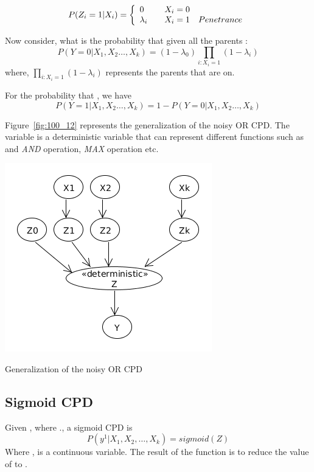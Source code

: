 \[
  P(Z_i =1 |X_i	) = \left\{
  \begin{array}{l l}
    0  & \quad X_i=0\\
    \lambda_i & \quad X_i=1 \quad Penetrance\\
  \end{array} \right.
\]

Now consider, what is the probability that  given all the parents :
\[P(Y=0|X_1,X_2 \ldots, X_k) = (1-\lambda_0	) \prod\limits_{i:X_i=1} (1-\lambda_i) \] where, $\prod\limits_{i:X_i=1} (1-\lambda_i)$ represents the parents that are on.

For the probability that , we have
\[  P(Y=1|X_1,X_2 \ldots, X_k) =   1- P(Y=0|X_1,X_2 \ldots, X_k)  \]

 Figure~\ref{fig:100_12} represents the generalization of the noisy OR CPD.  The variable  is a deterministic variable that can represent different functions such as and \emph{AND} operation, \emph{MAX} operation etc.

\begin{marginfigure}
\includegraphics{images/100_12}
\caption{Generalization of the noisy OR CPD}
\label{fig:100_12}
\end{marginfigure}

\subsection{Sigmoid CPD} 

Given , where ., a sigmoid CPD is
\[P(y^1 | X_1, X_2, \ldots, X_k) = sigmoid(Z) \]
Where ,  is a continuous variable.  The result of the  function is to reduce the value of  to \m{[0,1]}.

